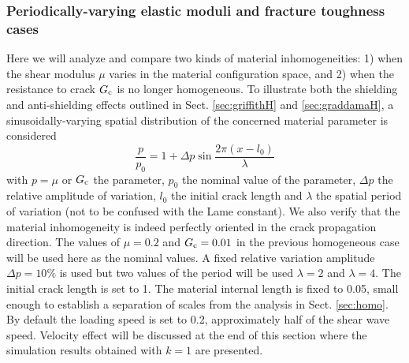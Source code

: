 \subsubsection{Periodically-varying elastic moduli and fracture toughness cases} \label{sec:GcEsin}
Here we will analyze and compare two kinds of material inhomogeneities: 1) when the shear modulus $\mu$ varies in the material configuration space, and 2) when the resistance to crack $G_\mathrm{c}$ is no longer homogeneous. To illustrate both the shielding and anti-shielding effects outlined in Sect. \ref{sec:griffithH} and \ref{sec:graddamaH}, a sinusoidally-varying spatial distribution of the concerned material parameter is considered
\begin{equation} \label{eq:sinus}
\frac{p}{p_0}=1+\Delta p\sin\frac{2\pi(x-l_0)}{\lambda}
\end{equation}
with $p=\mu$ or $G_\mathrm{c}$ the parameter, $p_0$ the nominal value of the parameter, $\Delta p$ the relative amplitude of variation, $l_0$ the initial crack length and $\lambda$ the spatial period of variation (not to be confused with the Lame constant). We also verify that the material inhomogeneity is indeed perfectly oriented in the crack propagation direction. The values of $\mu=0.2$ and $G_\mathrm{c}=0.01$ in the previous homogeneous case will be used here as the nominal values. A fixed relative variation amplitude $\Delta p=10\%$ is used but two values of the period will be used $\lambda=2$ and $\lambda=4$. The initial crack length is set to 1. The material internal length is fixed to 0.05, small enough to establish a separation of scales from the analysis in Sect. \ref{sec:homo}. By default the loading speed is set to 0.2, approximately half of the shear wave speed. Velocity effect will be discussed at the end of this section where the simulation results obtained with $k=1$ are presented.

